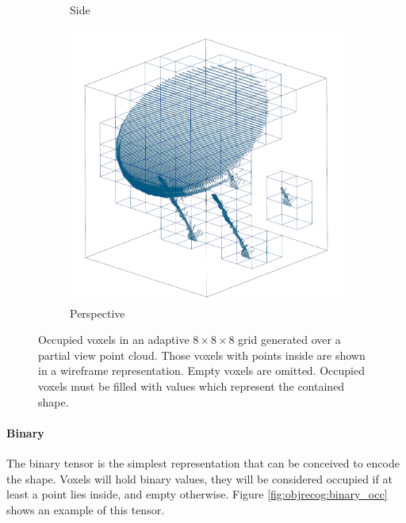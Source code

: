 \begin{figure}[!htb]
\begin{subfigure}{0.325\textwidth}
		\caption{Side}
		\label{subfig:objrecog:grid_occ:side}
	\end{subfigure}
	\hfill
	\begin{subfigure}{0.325\textwidth}
		\centering
		\includegraphics[width=\linewidth]{Figures/ObjRecog/surface_grid_persp}
		\caption{Perspective}
		\label{subfig:objrecog:grid_occ:persp}
	\end{subfigure}
	\hfill
	\caption{Occupied voxels in an adaptive $8\times8\times8$ grid generated over a partial view point cloud. Those voxels with points inside are shown in a wireframe representation. Empty voxels are omitted. Occupied voxels must be filled with values which represent the contained shape.}
	\label{fig:objrecog:grid_occ}
\end{figure}

\paragraph{Binary}

The binary tensor is the simplest representation that can be conceived to encode the shape. Voxels will hold binary values, they will be considered occupied if at least a point lies inside, and empty otherwise. Figure \ref{fig:objrecog:binary_occ} shows an example of this tensor.

